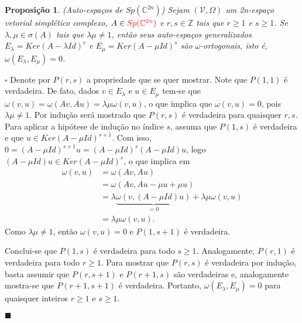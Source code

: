 \documentclass[12pt]{book}
\newtheorem{proposicao}[teorema]{Proposição}
\newenvironment{prova}[1]{$\square$ #1}{\hfill$\blacksquare$}
\newcommand{\complexificado}[1]{\mathcal{#1}}
\newcommand{\complexo}[1]{\mathbb{C}^{#1}}
\newcommand{\formaSimpletica}[2]{\omega(#1, #2)}
\newcommand{\gruposimpletico}[1]{Sp(#1)}
\newcommand{\inteiros}{\mathbb{Z}}
\newcommand{\alerta}[1]{{\color{red}#1}}
\begin{document}
	\begin{proposicao}\label{proposicao_auto_espaco_grupo_simpletico}
		(Auto-espaços de $\gruposimpletico{\complexo{2n}}$) Sejam $(\complexificado{V}, \Omega)$ um 2n-espaço vetorial simplético complexo, $A \in \alerta{\gruposimpletico{\complexo{2n}}}$ e $r,s \in \inteiros$ tais que $r\geq 1$ e $s\geq 1$. Se $\lambda, \mu \in \sigma(A)$ tais que $\lambda\mu \neq 1$, então seus auto-espaços generalizados $E_{\lambda}=Ker(A-\lambda Id)^{r}$ e  $E_{\mu}=Ker(A-\mu Id)^{s}$ são $\omega$-ortogonais, isto é, $\omega(E_{\lambda}, E_{\mu}) = 0$.
	\end{proposicao}
	\begin{prova}
		Denote por $P(r,s)$ a propriedade que se quer mostrar. Note que $P(1,1)$ é verdadeira. De fato, dados $v\in E_{\lambda}$ e $u\in E_{\mu}$ tem-se que $\formaSimpletica{v}{u} = \formaSimpletica{Av}{Au} = \lambda\mu\formaSimpletica{v}{u}$, o que implica que $\formaSimpletica{v}{u} = 0$, pois $\lambda\mu\neq 1$. Por indução será mostrado que $P(r,s)$ é verdadeira para quaisquer $r,s$. Para aplicar a hipótese de indução no índice $s$, assuma que $P(1,s)$ é verdadeira e que $u \in Ker(A-\mu Id)^{s+1}$. Com isso, $0=(A-\mu Id)^{s+1}u = (A-\mu Id)^{s}(A-\mu Id)u $, logo $(A-\mu Id)u \in Ker(A-\mu Id)^{s}$, o que implica em
		$$
		\begin{aligned}
		\formaSimpletica{v}{u}
		&=\formaSimpletica{Av}{Au}
		\\
		&= \formaSimpletica{Av}{Au -\mu u +\mu u} 
		\\
		&= \lambda\underbrace{\formaSimpletica{v}{(A-\mu Id)u}}_{=0}+\lambda\mu\formaSimpletica{v}{u}
		\\
		&=\lambda\mu\formaSimpletica{v}{u}.
		\end{aligned}
		$$
		Como $\lambda\mu \neq 1$, então $\formaSimpletica{v}{u}=0$ e $P(1, s+1)$ é verdadeira.
		
		Conclui-se que $P(1, s)$ é verdadeira para todo $s\geq 1$. Analogamente, $P(r,1)$ é verdadeira para todo $r\geq 1$. Para mostrar que $P(r,s)$ é verdadeira por indução, basta assumir que $P(r,s+1)$ e $P(r+1,s)$ são verdadeiras e, analogamente mostra-se que $P(r+1,s+1)$ é verdadeira. Portanto, $\omega(E_{\lambda}, E_{\mu}) = 0$ para quaisquer inteiros $r\geq 1$ e $s\geq 1$.
		
	\end{prova}
	
\end{document}
